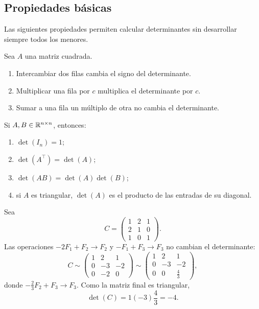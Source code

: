 \documentclass[compacto,10pt]{pubciencias-notas}
\begin{document}
\subsection{Propiedades básicas}

Las siguientes propiedades permiten calcular determinantes sin desarrollar
siempre todos los menores.

\begin{prop}\label{sem04cl02:prop-filas}
    Sea $A$ una matriz cuadrada.
    \begin{enumerate}
        \item Intercambiar dos filas cambia el signo del determinante.
        \item Multiplicar una fila por $c$ multiplica el determinante por $c$.
        \item Sumar a una fila un múltiplo de otra no cambia el determinante.
    \end{enumerate}
\end{prop}

\begin{prop}
    Si $A,B\in\Mat[\R]{n}{n}$, entonces:
    \begin{enumerate}
        \item $\det(I_n)=1$;
        \item $\det(A^{\top})=\det(A)$;
        \item $\det(AB)=\det(A)\det(B)$;
        \item si $A$ es triangular, $\det(A)$ es el producto de las entradas
              de su diagonal.
    \end{enumerate}
\end{prop}

\begin{ejem}
    Sea
    \[
        C=\begin{pmatrix}1&2&1\\2&1&0\\1&0&1\end{pmatrix}.
    \]
    Las operaciones $-2F_1+F_2\to F_2$ y
    $-F_1+F_3\to F_3$ no cambian el determinante:
    \[
        C\sim\begin{pmatrix}1&2&1\\0&-3&-2\\0&-2&0\end{pmatrix}
        \sim\begin{pmatrix}1&2&1\\0&-3&-2\\0&0&\frac{4}{3}\end{pmatrix},
    \]
    donde $-\frac{2}{3}F_2+F_3\to F_3$. Como la matriz final es
    triangular,
    \[
        \det(C)=1(-3)\frac{4}{3}=-4.
    \]
\end{ejem}
\end{document}
